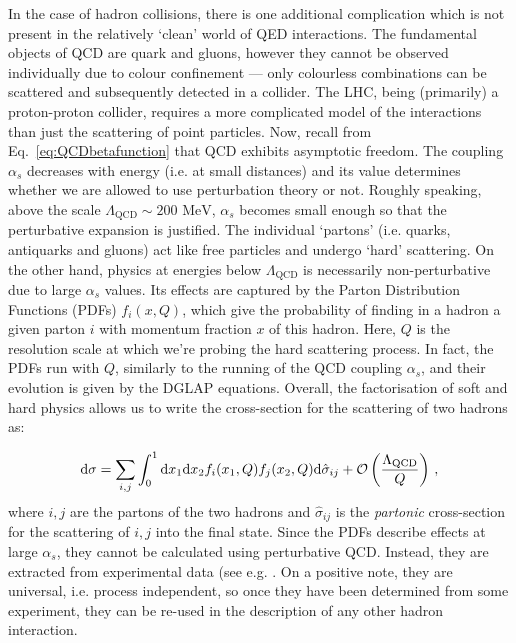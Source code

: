 \documentclass[main.tex]{subfiles}
\begin{document}
In the case of hadron collisions, there is one additional complication which is not present in the relatively `clean' world of QED interactions. The fundamental objects of QCD are quark and gluons, however they cannot be observed individually due to colour confinement --- only colourless combinations can be scattered and subsequently detected in a collider. The LHC, being (primarily) a proton-proton collider, requires a more complicated model of the interactions than just the scattering of point particles. Now, recall from Eq.~\ref{eq:QCDbetafunction} that QCD exhibits asymptotic freedom. The coupling $\alpha_s$ decreases with energy (i.e. at small distances) and its value determines whether we are allowed to use perturbation theory or not. Roughly speaking, above the scale $\Lambda_\text{QCD} \sim 200 \text{ MeV}$, $\alpha_s$ becomes small enough so that the perturbative expansion is justified. The individual `partons' (i.e. quarks, antiquarks and gluons) act like free particles and undergo `hard' scattering\cite{PhysRevLett.23.1415}. On the other hand, physics at energies below $\Lambda_\text{QCD}$ is necessarily non-perturbative due to large $\alpha_s$ values. Its effects are captured by the Parton Distribution Functions (PDFs) $f_i(x, Q)$, which give the probability of finding in a hadron a given parton $i$ with momentum fraction $x$ of this hadron. Here, $Q$ is the resolution scale at which we're probing the hard scattering process. In fact, the PDFs run with $Q$, similarly to the running of the QCD coupling $\alpha_s$, and their evolution is given by the DGLAP equations.
Overall, the factorisation of soft and hard physics allows us to write the cross-section for the scattering of two hadrons as:

\begin{equation} \label{eq:factorisation}
    \mathrm{d} \sigma = \sum_{i,j} \int_0^1 \mathrm{d} x_1 \mathrm{d} x_2 f_i(x_1, Q) f_j(x_2, Q) \mathrm{d} \hat{\sigma}_{ij} + \mathcal{O}\left(\frac{\Lambda_\text{QCD}}{Q}\right)\,,
\end{equation}
where $i, j$ are the partons of the two hadrons and $\hat{\sigma}_{ij}$ is the \textit{partonic} cross-section for the scattering of $i,j$ into the final state. Since the PDFs describe effects at large $\alpha_s$, they cannot be calculated using perturbative QCD. Instead, they are extracted from experimental data (see e.g. \cite{H1:2015ubc, Alekhin:2017kpj, Hou:2019efy, NNPDF:2021uiq, Buckley:2014ana}. On a positive note, they are universal, i.e. process independent, so once they have been determined from some experiment, they can be re-used in the description of any other hadron interaction. 
\end{document}
